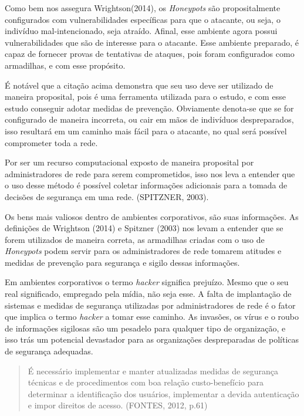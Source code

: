 Como bem nos assegura Wrightson(2014), os \textit{Honeypots} são propositalmente configurados com vulnerabilidades específicas para que o atacante, ou seja, o indivíduo mal-intencionado, seja atraído. Afinal, esse ambiente agora possui vulnerabilidades que são de interesse para o atacante. Esse ambiente preparado, é capaz de fornecer provas de tentativas de ataques, pois foram configurados como armadilhas, e com esse propósito.

É notável que a citação acima demonstra que seu uso deve ser utilizado de maneira proposital, pois é uma ferramenta utilizada para o estudo, e com esse estudo conseguir adotar medidas de prevenção. Obviamente denota-se que se for configurado de maneira incorreta, ou cair em mãos de indivíduos despreparados, isso resultará em um caminho mais fácil para o atacante, no qual será possível comprometer toda a rede.

Por ser um recurso computacional exposto de maneira proposital por administradores de rede para serem comprometidos, isso nos leva a entender que o uso desse método é possível coletar informações adicionais para a tomada de decisões de segurança em uma rede. (SPITZNER, 2003).

Os bens mais valiosos dentro de ambientes corporativos, são suas informações. As definições de Wrightson (2014) e Spitzner (2003) nos levam a entender que se forem utilizados de maneira correta, as armadilhas criadas com o uso de \textit{Honeypots} podem servir para os administradores de rede tomarem atitudes e medidas de prevenção para segurança e sigilo dessas informações.

Em ambientes corporativos o termo \textit{hacker} significa prejuízo. Mesmo que o seu real significado, empregado pela mídia, não seja esse. A falta de implantação de sistemas e medidas de segurança utilizadas por administradores de rede é o fator que implica o termo \textit{hacker} a tomar esse caminho. As invasões, os vírus e o roubo de informações sigilosas são um pesadelo para qualquer tipo de organização, e isso trás um potencial devastador para as organizações despreparadas de políticas de segurança adequadas.

\begin{quote}
É necessário implementar e manter atualizadas medidas de segurança técnicas e de procedimentos com boa relação custo-benefício para determinar a identificação dos usuários, implementar a devida autenticação e impor direitos de acesso. (FONTES, 2012, p.61)
\end{quote}

